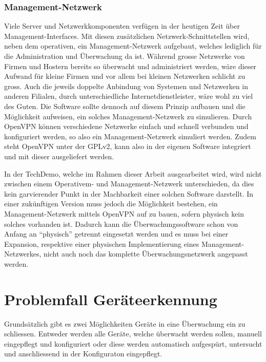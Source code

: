 \subsubsection{Management-Netzwerk} \label{sec:theorie-nat-fazit-mgmt}
Viele Server und Netzwerkkomponenten verf\"ugen in der heutigen Zeit \"uber Management-Interfaces. Mit diesen zus\"atzlichen Netzwerk-Schnittstellen wird, neben dem operativen, ein Management-Netzwerk aufgebaut, welches lediglich f\"ur die Administration und \"Uberwachung da ist. W\"ahrend grosse Netzwerke von Firmen und Hostern bereits so \"uberwacht und administriert werden, w\"are dieser Aufwand f\"ur kleine Firmen und vor allem bei kleinen Netzwerken schlicht zu gross. Auch die jeweils doppelte Anbindung von Systemen und Netzwerken in anderen Filialen, durch unterschiedliche Internetdienstleister, w\"are wohl zu viel des Guten. Die Software sollte dennoch auf diesem Prinzip aufbauen und die M\"oglichkeit aufweisen, ein solches Management-Netzwerk zu simulieren. Durch OpenVPN k\"onnen verschiedene Netzwerke einfach und schnell verbunden und konfiguriert werden, so also ein Management-Netzwerk simuliert werden. Zudem steht OpenVPN unter der GPLv2, kann also in der eigenen Software integriert und mit dieser ausgeliefert werden.

In der TechDemo, welche im Rahmen dieser Arbeit ausgearbeitet wird, wird nicht zwischen einem Operativem- und Management-Netzwerk unterschieden, da dies kein garvierender Punkt in der Machbarkeit einer solchen Software darstellt. In einer zuk\"unftigen Version muss jedoch die M\"oglichkeit bestehen, ein Management-Netzwerk mittels OpenVPN auf zu bauen, sofern physisch kein solches vorhanden ist. Dadurch kann die \"Uberwachungssoftware schon von Anfang an "`physisch"' getrennt eingesetzt werden und es muss bei einer Expansion, respektive einer physischen Implementierung eines Management-Netzwerkes, nicht auch noch das komplette \"Uberwachungsnetzwerk angepasst werden.


\section{Problemfall Ger\"ateerkennung} \label{sec:theorie-discovery}
Grunds\"atzlich gibt es zwei M\"oglichkeiten Ger\"ate in eine \"Uberwachung ein zu schliessen. Entweder werden alle Ger\"ate, welche \"uberwacht werden sollen, manuell eingepflegt und konfiguriert oder diese werden automatisch aufgesp\"urt, untersucht und anschliessend in der Konfiguraton eingepflegt.

